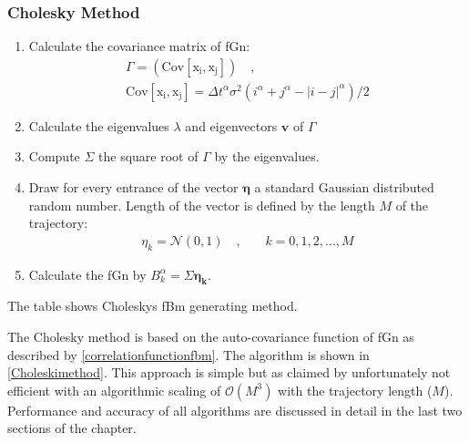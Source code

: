 \documentclass[
  a4paper,BCOR10mm,oneside,
  headsepline,footsepline,%
  fleqn,openbib
]{scrbook}
\begin{document}
\subsubsection{Cholesky Method}
\begin{table}
\begin{framed}
\begin{enumerate}
 \item Calculate the covariance matrix of fGn:
 \begin{align}
  \Gamma=(\mathrm{Cov[x_i,x_j]}) \quad , \\  \mathrm{Cov[x_i,x_j]}=\Delta t^\alpha \sigma^2(i^{\alpha}+j^{\alpha}-|i-j|^\alpha)/2
 \end{align}
\item Calculate the eigenvalues $\lambda$ and eigenvectors $\bm{v}$ of $\Gamma$ 
\item Compute $\Sigma$ the square root of $\Gamma$ by the eigenvalues.
\item Draw for every entrance of the vector $\bm{\eta}$  a standard Gaussian distributed random number. Length of the vector is defined by the length $M$ of the trajectory:
\begin{align}
 \eta_k= \mathcal{N}(0,1) \quad \text{,}  \qquad k=0,1,2,...,M 
\end{align}
\item Calculate the fGn by $B^{\alpha}_k =\Sigma \bm{\eta_k}$.
\end{enumerate}
\end{framed}
\caption{The table shows Choleskys fBm generating method.}
\label{Choleskimethod}
\end{table}
The Cholesky method \cite{Dieker2004} is based on the auto-covariance function of fGn as described by \cref{correlationfunctionfbm}. The algorithm is shown in \cref{Choleskimethod}. This approach is simple but as claimed by \citet{Dieker2004} unfortunately not efficient with an algorithmic scaling of $\mathcal{O}(M^3)$ with the trajectory length ($M$). Performance and accuracy of all algorithms are discussed in detail in the last two sections of the chapter.
\end{document}
